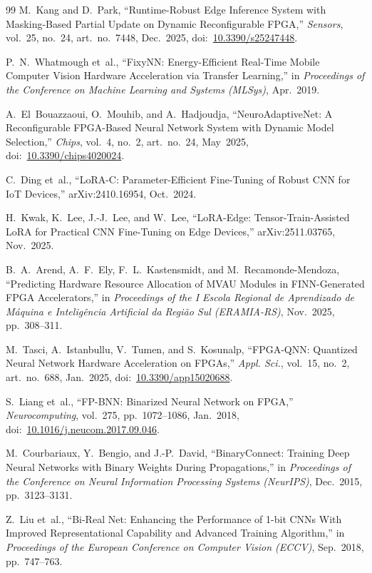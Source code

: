 \documentclass[12pt, a4paper]{report}
\numberwithin{equation}{chapter}
\numberwithin{figure}{chapter}
\numberwithin{table}{chapter}
\numberwithin{algorithm}{chapter}
\begin{document}
\begin{thebibliography}{99}
M.~Kang and D.~Park,
``Runtime-Robust Edge Inference System with Masking-Based Partial Update on Dynamic Reconfigurable FPGA,''
\emph{Sensors}, vol.~25, no.~24, art.~no.~7448, Dec.~2025,
doi:~\url{10.3390/s25247448}.

P.~N.~Whatmough et~al.,
``FixyNN: Energy-Efficient Real-Time Mobile Computer Vision Hardware Acceleration via Transfer Learning,''
in \emph{Proceedings of the Conference on Machine Learning and Systems (MLSys)}, Apr.~2019.

A.~El~Bouazzaoui, O.~Mouhib, and A.~Hadjoudja,
``NeuroAdaptiveNet: A Reconfigurable FPGA-Based Neural Network System with Dynamic Model Selection,''
\emph{Chips}, vol.~4, no.~2, art.~no.~24, May~2025,
doi:~\url{10.3390/chips4020024}.

C.~Ding et~al.,
``LoRA-C: Parameter-Efficient Fine-Tuning of Robust CNN for IoT Devices,''
arXiv:2410.16954, Oct.~2024.

H.~Kwak, K.~Lee, J.-J.~Lee, and W.~Lee,
``LoRA-Edge: Tensor-Train-Assisted LoRA for Practical CNN Fine-Tuning on Edge Devices,''
arXiv:2511.03765, Nov.~2025.

B.~A.~Arend, A.~F.~Ely, F.~L.~Kastensmidt, and M.~Recamonde-Mendoza,
``Predicting Hardware Resource Allocation of MVAU Modules in FINN-Generated FPGA Accelerators,''
in \emph{Proceedings of the I Escola Regional de Aprendizado de M\'aquina e Intelig\^encia Artificial da Regi\~ao Sul (ERAMIA-RS)}, Nov.~2025, pp.~308--311.

M.~Tasci, A.~Istanbullu, V.~Tumen, and S.~Kosunalp,
``FPGA-QNN: Quantized Neural Network Hardware Acceleration on FPGAs,''
\emph{Appl. Sci.}, vol.~15, no.~2, art.~no.~688, Jan.~2025,
doi:~\url{10.3390/app15020688}.

S.~Liang et~al.,
``FP-BNN: Binarized Neural Network on FPGA,''
\emph{Neurocomputing}, vol.~275, pp.~1072--1086, Jan.~2018,
doi:~\url{10.1016/j.neucom.2017.09.046}.

M.~Courbariaux, Y.~Bengio, and J.-P.~David,
``BinaryConnect: Training Deep Neural Networks with Binary Weights During Propagations,''
in \emph{Proceedings of the Conference on Neural Information Processing Systems (NeurIPS)}, Dec.~2015, pp.~3123--3131.

Z.~Liu et~al.,
``Bi-Real Net: Enhancing the Performance of 1-bit CNNs With Improved Representational Capability and Advanced Training Algorithm,''
in \emph{Proceedings of the European Conference on Computer Vision (ECCV)}, Sep.~2018, pp.~747--763.


\end{thebibliography}
\end{document}
